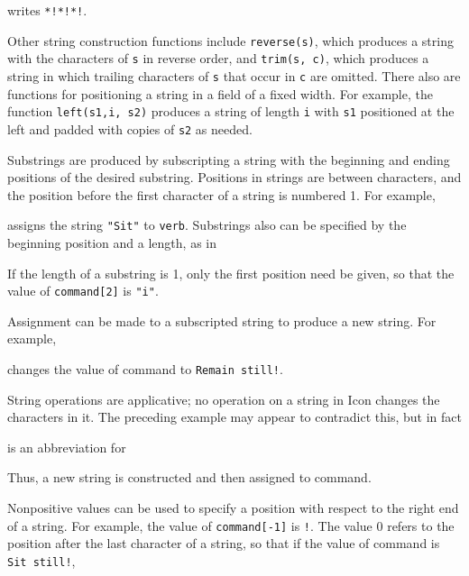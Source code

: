 \noindent writes \texttt{*!*!*!}.

Other string construction functions include \texttt{reverse(s)}, which
produces a string with the characters of \texttt{s} in reverse order,
and \texttt{trim(s, c)}, which produces a string in which trailing
characters of \texttt{s} that occur in \texttt{c} are omitted. There
also are functions for positioning a string in a field of a fixed
width. For example, the function \texttt{left(s1,i, s2)} produces a
string of length \texttt{i} with \texttt{s1} positioned at the left
and padded with copies of \texttt{s2} as needed.

Substrings are produced by subscripting a string with the beginning
and ending positions of the desired substring.  Positions in strings
are between characters, and the position before the first character of
a string is numbered 1. For example,


\noindent assigns the string \texttt{"Sit"} to
\texttt{verb}. Substrings also can be specified by the beginning
position and a length, as in


If the length of a substring is 1, only the first position need be
given, so that the value of \texttt{command[2]} is
\texttt{"i"}.

Assignment can be made to a subscripted string to produce a new
string. For example,


\noindent changes the value of command to
\texttt{{\textquotedbl}Remain still!{\textquotedbl}}.

String operations are applicative; no operation on a string in Icon
changes the characters in it. The preceding example may appear to
contradict this, but in fact


\noindent
is an abbreviation for


Thus, a new string is constructed and then assigned to command.

Nonpositive values can be used to specify a position with respect to
the right end of a string. For example, the value of
\texttt{command[-1]} is \texttt{{\textquotedbl}!{\textquotedbl}}. The
value 0 refers to the position after the last character of a string,
so that if the value of command is \texttt{{\textquotedbl}Sit
still!{\textquotedbl}},

